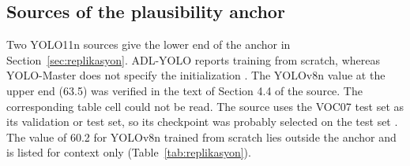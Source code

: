 \subsection{Sources of the plausibility anchor}\label{sec:ek-cipa}
Two YOLO11n sources give the lower end of the anchor in Section~\ref{sec:replikasyon}. ADL-YOLO reports training from scratch, whereas YOLO-Master does not specify the initialization \cite{zhang_2025_adlyolo,lin_2025_yolomaster}. The YOLOv8n value at the upper end (63.5) was verified in the text of Section 4.4 of the source. The corresponding table cell could not be read. The source uses the VOC07 test set as its validation or test set, so its checkpoint was probably selected on the test set \cite{elhamdouni_2025_yolov8nvoc}. The value of 60.2 for YOLOv8n trained from scratch lies outside the anchor and is listed for context only (Table~\ref{tab:replikasyon}).
